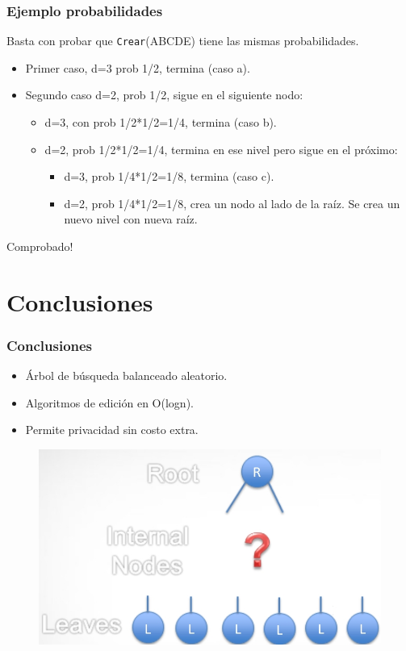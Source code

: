\documentclass[10pt]{beamer}
\begin{document}
\begin{frame}
\frametitle{Ejemplo probabilidades}

Basta con probar que \texttt{Crear}(ABCDE) tiene las mismas probabilidades.

\begin{itemize}
  \item Primer caso, d=3 prob 1/2, termina (caso a). \pause
  \item Segundo caso d=2, prob 1/2, sigue en el siguiente nodo:
\pause
    \begin{itemize}\pause
      \item d=3, con prob 1/2*1/2=1/4, termina (caso b).\pause
      \item d=2, prob 1/2*1/2=1/4, termina en ese nivel pero sigue en el próximo:
\pause
        \begin{itemize}\pause
          \item d=3, prob 1/4*1/2=1/8, termina (caso c).\pause
          \item d=2, prob 1/4*1/2=1/8, crea un nodo al lado de la raíz. Se crea
            un nuevo nivel con nueva raíz.
        \end{itemize}
    \end{itemize}
\end{itemize}

\pause

Comprobado!

\end{frame}

\section{Conclusiones}
\begin{frame}
\frametitle{Conclusiones}
\begin{itemize}
  \item Árbol de búsqueda balanceado aleatorio.
  \item Algoritmos de edición en O(logn).
  \item Permite privacidad sin costo extra.
\end{itemize}
\begin{figure}[h!]
    \centering
    \includegraphics[scale=0.3]{conc.jpg}
\end{figure}


\end{frame}
\end{document}
